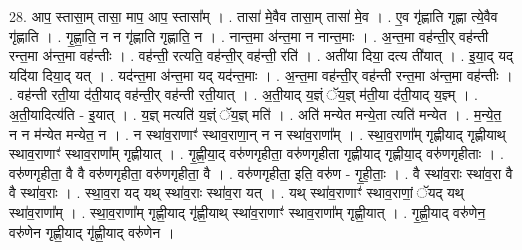 \documentclass[17pt]{extarticle}
\begin{document}
28. आप॒ स्तासा॒म् तासा॒ माप॒ आप॒ स्तासा᳚म् । . तासा॑ मे॒वैव तासा॒म् तासा॑ मे॒व । . ए॒व गृ॑ह्णाति गृह्णा त्ये॒वैव गृ॑ह्णाति । . गृ॒ह्णा॒ति॒ न न गृ॑ह्णाति गृह्णाति॒ न । . नान्त॒मा अ॑न्त॒मा न नान्त॒माः । . अ॒न्त॒मा वह॑न्ती॒र् वह॑न्ती रन्त॒मा अ॑न्त॒मा वह॑न्तीः । . वह॑न्ती॒ रत्यति॒ वह॑न्ती॒र् वह॑न्ती॒ रति॑ । . अती॑या दिया॒ दत्य ती॑यात् । . इ॒या॒द् यद् यदि॑या दिया॒द् यत् । . यद॑न्त॒मा अ॑न्त॒मा यद् यद॑न्त॒माः । . अ॒न्त॒मा वह॑न्ती॒र् वह॑न्ती रन्त॒मा अ॑न्त॒मा वह॑न्तीः । . वह॑न्ती रती॒या द॑ती॒याद् वह॑न्ती॒र् वह॑न्ती रती॒यात् । . अ॒ती॒याद् य॒ज्ञ्ं ॅय॒ज्ञ् म॑ती॒या द॑ती॒याद् य॒ज्ञ्म् । . अ॒ती॒यादित्य॑ति - इ॒यात् । . य॒ज्ञ् मत्यति॑ य॒ज्ञ्ं ॅय॒ज्ञ् मति॑ । . अति॑ मन्येत मन्ये॒ता त्यति॑ मन्येत । . म॒न्ये॒त॒ न न म॑न्येत मन्येत॒ न । . न स्था॑व॒राणाꣳ॑ स्थाव॒राणा॒न् न न स्था॑व॒राणा᳚म् । . स्था॒व॒राणा᳚म् गृह्णीयाद् गृह्णीयाथ् स्थाव॒राणाꣳ॑ स्थाव॒राणा᳚म् गृह्णीयात् । . गृ॒ह्णी॒या॒द् वरु॑णगृहीता॒ वरु॑णगृहीता गृह्णीयाद् गृह्णीया॒द् वरु॑णगृहीताः । . वरु॑णगृहीता॒ वै वै वरु॑णगृहीता॒ वरु॑णगृहीता॒ वै । . वरु॑णगृहीता॒ इति॒ वरु॑ण - गृ॒ही॒ताः॒ । . वै स्था॑व॒राः स्था॑व॒रा वै वै स्था॑व॒राः । . स्था॒व॒रा यद् यथ् स्था॑व॒राः स्था॑व॒रा यत् । . यथ् स्था॑व॒राणाꣳ॑ स्थाव॒राणां॒ ॅयद् यथ् स्था॑व॒राणा᳚म् । . स्था॒व॒राणा᳚म् गृह्णी॒याद् गृ॑ह्णी॒याथ् स्था॑व॒राणाꣳ॑ स्थाव॒राणा᳚म् गृह्णी॒यात् । . गृ॒ह्णी॒याद् वरु॑णेन॒ वरु॑णेन गृह्णी॒याद् गृ॑ह्णी॒याद् वरु॑णेन । \newline
\end{document}
